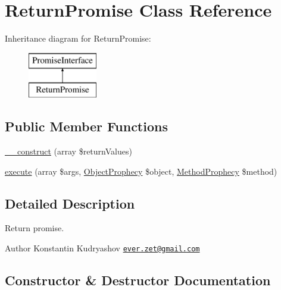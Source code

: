 \hypertarget{class_prophecy_1_1_promise_1_1_return_promise}{}\section{Return\+Promise Class Reference}
\label{class_prophecy_1_1_promise_1_1_return_promise}
Inheritance diagram for Return\+Promise\+:\begin{figure}[H]
\begin{center}
\leavevmode
\includegraphics[height=2.000000cm]{class_prophecy_1_1_promise_1_1_return_promise}
\end{center}
\end{figure}
\subsection*{Public Member Functions}
\begin{DoxyCompactItemize}
\item 
\mbox{\hyperlink{class_prophecy_1_1_promise_1_1_return_promise_a33502c2918273e948a4b0ff928b2bda8}{\+\_\+\+\_\+construct}} (array \$return\+Values)
\item 
\mbox{\hyperlink{class_prophecy_1_1_promise_1_1_return_promise_a2b8542872672f9ac4ed0c942f931f0c6}{execute}} (array \$args, \mbox{\hyperlink{class_prophecy_1_1_prophecy_1_1_object_prophecy}{Object\+Prophecy}} \$object, \mbox{\hyperlink{class_prophecy_1_1_prophecy_1_1_method_prophecy}{Method\+Prophecy}} \$method)
\end{DoxyCompactItemize}


\subsection{Detailed Description}
Return promise.

\begin{DoxyAuthor}{Author}
Konstantin Kudryashov \href{mailto:ever.zet@gmail.com}{\tt ever.\+zet@gmail.\+com} 
\end{DoxyAuthor}


\subsection{Constructor \& Destructor Documentation}
\mbox{\label{class_prophecy_1_1_promise_1_1_return_promise_a33502c2918273e948a4b0ff928b2bda8}} 
